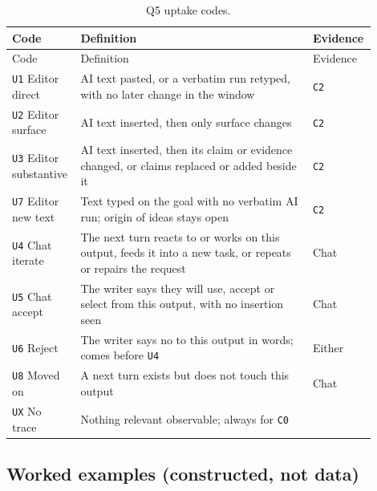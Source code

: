 \documentclass[manuscript,screen]{acmart}
\newcommand{\code}[1]{\texttt{#1}}
\begin{document}
\begin{longtable}{p{0.18\linewidth}p{0.62\linewidth}p{0.10\linewidth}}
\caption{Q5 uptake codes.}\\
\toprule
Code & Definition & Evidence \\
\midrule
\endfirsthead
\toprule
Code & Definition & Evidence \\
\midrule
\endhead
\code{U1} Editor direct & AI text pasted, or a verbatim run retyped, with no later change in the window & \code{C2} \\
\code{U2} Editor surface & AI text inserted, then only surface changes & \code{C2} \\
\code{U3} Editor substantive & AI text inserted, then its claim or evidence changed, or claims replaced or added beside it & \code{C2} \\
\code{U7} Editor new text & Text typed on the goal with no verbatim AI run; origin of ideas stays open & \code{C2} \\
\code{U4} Chat iterate & The next turn reacts to or works on this output, feeds it into a new task, or repeats or repairs the request & Chat \\
\code{U5} Chat accept & The writer says they will use, accept or select from this output, with no insertion seen & Chat \\
\code{U6} Reject & The writer says no to this output in words; comes before \code{U4} & Either \\
\code{U8} Moved on & A next turn exists but does not touch this output & Chat \\
\code{UX} No trace & Nothing relevant observable; always for \code{C0} & \\
\bottomrule
\end{longtable}

\subsection{Worked examples (constructed, not data)}
\end{document}
